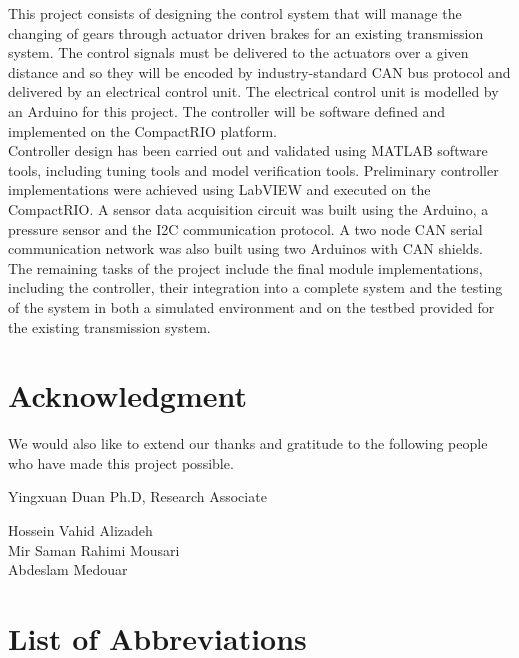 \documentclass{article}
\begin{document}
\noindent This project consists of designing the control system that will manage the changing of gears through actuator driven brakes for an existing transmission system. The control signals must be delivered to the actuators over a given distance and so they will be encoded by industry-standard CAN bus protocol and delivered by an electrical control unit. The electrical control unit is modelled by an Arduino for this project. The controller will be software defined and implemented on the CompactRIO platform. \\

\noindent Controller design has been carried out and validated using MATLAB software tools, including tuning tools and model verification tools. Preliminary controller implementations were achieved using LabVIEW and executed on the CompactRIO. A sensor data acquisition circuit was built using the Arduino, a pressure sensor and the I2C communication protocol. A two node CAN serial communication network was also built using two Arduinos with CAN shields. \\

\noindent The remaining tasks of the project include the final module implementations, including the controller, their integration into a complete system and the testing of the system in both a simulated environment and on the testbed provided for the existing transmission system.

\section{Acknowledgment}
We would also like to extend our thanks and gratitude to the following people who have made this project possible.
\begin{flushleft}
Yingxuan Duan Ph.D, Research Associate
\end{flushleft}

\begin{flushleft}
Hossein Vahid Alizadeh\\
Mir Saman Rahimi Mousari\\
Abdeslam Medouar
\end{flushleft}

\newpage
\tableofcontents
\newpage

\section{List of Abbreviations}
\end{document}
